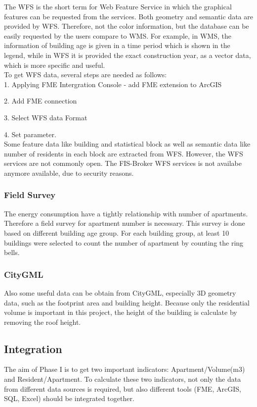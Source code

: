 The WFS  is the short term for Web Feature Service in which the graphical features can be requested from the services. Both geometry and semantic data are provided by WFS. Therefore, not the color information, but the database can be easily requested by the users compare to WMS. For example, in WMS, the information of building age is given in a time period which is shown in the legend, while in WFS it is provided the exact construction year, as a vector data, which is more specific and useful. \\
To get WFS data, several steps are needed  as follows:\\

1. Applying FME Intergration Console - add FME extension to ArcGIS

2. Add FME connection

3. Select WFS data Format

4. Set parameter.\\

Some feature data like building and statistical block as well as semantic data like number of residents in each block are extracted from WFS. However, the WFS services are not commonly open. The FIS-Broker WFS services is not availabe anymore available, due to security reasons.

\subsubsection{Field Survey}
The energy consumption have a tightly relationship with number of apartments. Therefore a field survey for apartment number is necessary. This survey is done based on different building age group. For each building group, at least 10 buildings were selected to count the number of apartment by counting the ring bells.
\subsubsection{CityGML}
Also some useful data can be obtain from CityGML, especially 3D geometry data, such as the footprint area and building height. Because only the residential volume is important in this project, the height of the building is calculate by removing the roof height.
\subsection{Integration}
The aim of Phase I is to get two important indicators: Apartment/Volume(m3) and Resident/Apartment. To calculate these two indicators, not only the data from different data sources is required, but also different tools (FME, ArcGIS, SQL, Excel) should be integrated together.
